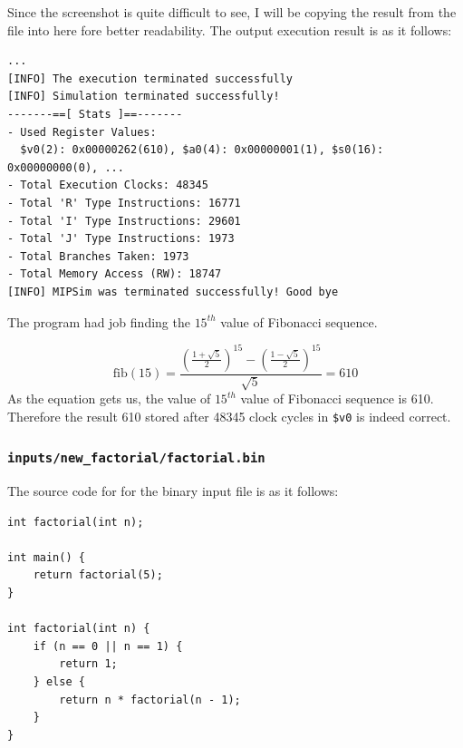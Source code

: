 \documentclass{homework}
\begin{document}
Since the screenshot is quite difficult to see, I will be copying the result from the file into here fore better readability. The output execution result is as it follows: 
\\
\begin{center}
\begin{code}
\begin{verbatim}
...
[INFO] The execution terminated successfully
[INFO] Simulation terminated successfully!
-------==[ Stats ]==-------
- Used Register Values:
  $v0(2): 0x00000262(610), $a0(4): 0x00000001(1), $s0(16): 0x00000000(0), ...
- Total Execution Clocks: 48345
- Total 'R' Type Instructions: 16771
- Total 'I' Type Instructions: 29601
- Total 'J' Type Instructions: 1973
- Total Branches Taken: 1973
- Total Memory Access (RW): 18747
[INFO] MIPSim was terminated successfully! Good bye
\end{verbatim}
\end{code}
\end{center}
The program had job finding the $15^{th}$ value of Fibonacci sequence.

\[
\text{{fib}}(15) = \frac{{\left(\frac{{1 + \sqrt{5}}}{2}\right)^{15} - \left(\frac{{1 - \sqrt{5}}}{2}\right)^{15}}}{{\sqrt{5}}} = 610
\]
As the equation gets us, the value of $15^{th}$ value of Fibonacci sequence is 610. Therefore the result 610 stored after 48345 clock cycles in \texttt{\$v0} is indeed correct.
\pagebreak

\subsubsection{\texttt{inputs/new_factorial/factorial.bin}}
The source code for for the binary input file is as it follows:
\\
\begin{center}
\begin{code}
\begin{verbatim}
int factorial(int n);

int main() {
    return factorial(5);
}

int factorial(int n) {
    if (n == 0 || n == 1) {
        return 1;
    } else {
        return n * factorial(n - 1);
    }
}
\end{verbatim}
\end{code}
\end{center}
\end{document}
